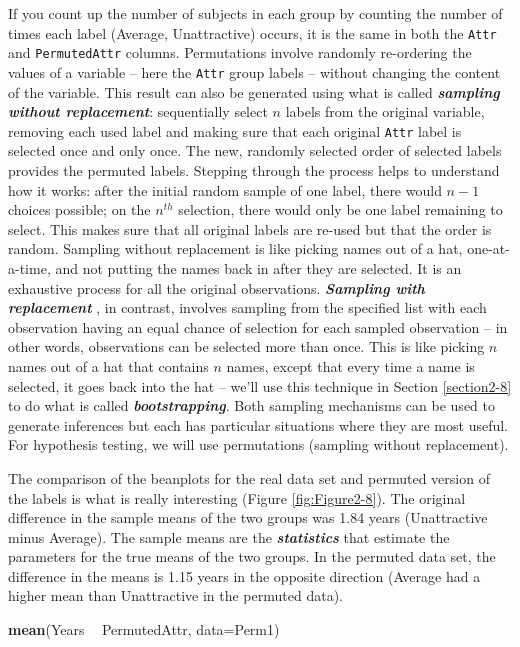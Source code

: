 \documentclass[]{book}
\newenvironment{Shaded}{\begin{snugshade}}{\end{snugshade}}
\newcommand{\KeywordTok}[1]{\textcolor[rgb]{0.13,0.29,0.53}{\textbf{#1}}}
\newcommand{\DataTypeTok}[1]{\textcolor[rgb]{0.13,0.29,0.53}{#1}}
\newcommand{\StringTok}[1]{\textcolor[rgb]{0.31,0.60,0.02}{#1}}
\newcommand{\OperatorTok}[1]{\textcolor[rgb]{0.81,0.36,0.00}{\textbf{#1}}}
\newcommand{\NormalTok}[1]{#1}
\theoremstyle{definition}
\theoremstyle{definition}
\theoremstyle{remark}
\begin{document}
If you count up the number of subjects in each group by counting the
number of times each label (Average, Unattractive) occurs, it is the
same in both the \texttt{Attr} and \texttt{PermutedAttr} columns.
Permutations involve randomly re-ordering the values of a variable --
here the \texttt{Attr} group labels -- without changing the content of
the variable. This result can also be generated using what is called
\textbf{\emph{sampling without replacement}}: sequentially select \(n\)
labels from the original variable, removing each used label and making
sure that each original \texttt{Attr} label is selected once and only
once. The new, randomly selected order of selected labels provides the
permuted labels. Stepping through the process helps to understand how it
works: after the initial random sample of one label, there would
\(n - 1\) choices possible; on the \(n^{th}\) selection, there would
only be one label remaining to select. This makes sure that all original
labels are re-used but that the order is random. Sampling without
replacement is like picking names out of a hat, one-at-a-time, and not
putting the names back in after they are selected. It is an exhaustive
process for all the original observations. \textbf{\emph{Sampling with
replacement}} , in contrast, involves sampling from the specified list
with each observation having an equal chance of selection for each
sampled observation -- in other words, observations can be selected more
than once. This is like picking \(n\) names out of a hat that contains
\(n\) names, except that every time a name is selected, it goes back
into the hat -- we'll use this technique in Section \ref{section2-8} to
do what is called \textbf{\emph{bootstrapping}}. Both sampling
mechanisms can be used to generate inferences but each has particular
situations where they are most useful. For hypothesis testing, we will
use permutations (sampling without replacement).

The comparison of the beanplots for the real data set and permuted
version of the labels is what is really interesting (Figure
\ref{fig:Figure2-8}). The original difference in the sample means of the
two groups was 1.84 years (Unattractive minus Average). The sample means
are the \textbf{\emph{statistics}} that estimate the parameters for the
true means of the two groups. In the permuted data set, the difference
in the means is 1.15 years in the opposite direction (Average had a
higher mean than Unattractive in the permuted data).

\begin{Shaded}
\begin{Highlighting}[]
\KeywordTok{mean}\NormalTok{(Years }\OperatorTok{~}\StringTok{ }\NormalTok{PermutedAttr, }\DataTypeTok{data=}\NormalTok{Perm1)}
\end{Highlighting}
\end{Shaded}
\end{document}
